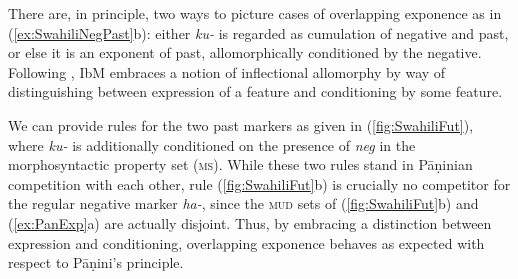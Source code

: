 \documentclass[output=paper
	        ,collection
	        ,collectionchapter
 	        ,biblatex
                ,babelshorthands
                ,newtxmath
                ,draftmode
                ,colorlinks, citecolor=brown
]{langscibook}
\begin{document}
\begin{exe}
\begin{xlist}
\begin{exe}
\begin{xlist}
\begin{exe}
  \ex  \label{ex:SwahiliNegFut}
  \begin{xlist}
  \end{xlist}
  \ex \label{ex:SwahiliNegPast}
  \begin{xlist}
  \end{xlist}

\end{exe}

There are, in principle, two ways to picture cases of overlapping
exponence as in (\ref{ex:SwahiliNegPast}b): either \textit{ku-} is
regarded as cumulation of negative and past, or else it is an exponent
of past, allomorphically conditioned by the negative.  Following
\citet{Carstairs87}, IbM embraces a notion of inflectional allomorphy
by way of distinguishing between expression of a feature and
conditioning by some feature.

\begin{exe}
  \ex \label{fig:SwahiliFut}
  \begin{xlist}
    \ex 
{}    \ex
{}
    
  \end{xlist}
\end{exe}

We can provide rules for the two past markers as given in
(\ref{fig:SwahiliFut}), where \textit{ku-} is additionally conditioned
on the presence of \textit{neg} in the morphosyntactic property set
(\textsc{ms}). While these two rules stand in Pāṇinian competition
with each other, rule (\ref{fig:SwahiliFut}b) is crucially no
competitor for the regular negative marker \textit{ha-}, since the
\textsc{mud} sets of (\ref{fig:SwahiliFut}b) and (\ref{ex:PanExp}a)
are actually disjoint. Thus, by embracing a distinction between
expression and conditioning, overlapping exponence behaves as expected
with respect to Pāṇini's principle.



\end{xlist}
\end{exe}
\end{xlist}
\end{exe}
\end{document}
